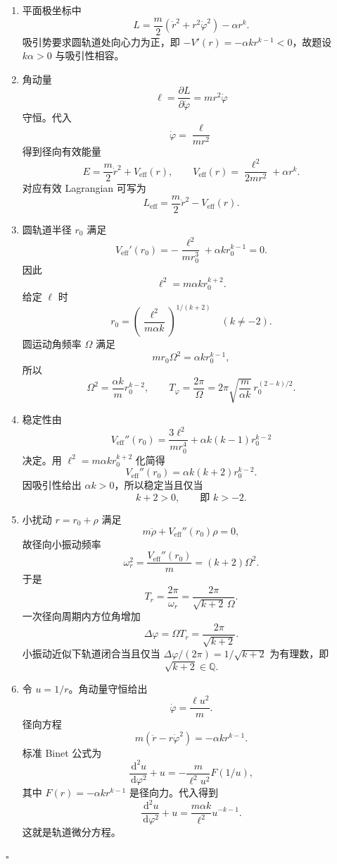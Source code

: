 \documentclass[UTF8,12pt]{ctexart}
\newcommand{\dd}{\,\mathrm d}
\newenvironment{solution}{%
  \par\medskip
  \noindent{\bfseries 解答}\quad\ignorespaces
}{\hfill$\square$\par\medskip}
\begin{document}
\begin{solution}
\begin{enumerate}[label=(\alph*)]
\item 平面极坐标中
\[
L=\frac m2(\dot r^2+r^2\dot\varphi^2)-\alpha r^k.
\]
吸引势要求圆轨道处向心力为正，即 \(-V'(r)=-\alpha k r^{k-1}<0\)，故题设 \(k\alpha>0\) 与吸引性相容。

\item 角动量
\[
\ell=\frac{\partial L}{\partial\dot\varphi}=mr^2\dot\varphi
\]
守恒。代入
\[
\dot\varphi=\frac{\ell}{mr^2}
\]
得到径向有效能量
\[
E=\frac m2\dot r^2+V_{\mathrm{eff}}(r),
\qquad
V_{\mathrm{eff}}(r)=\frac{\ell^2}{2mr^2}+\alpha r^k.
\]
对应有效 Lagrangian 可写为
\[
L_{\mathrm{eff}}=\frac m2\dot r^2-V_{\mathrm{eff}}(r).
\]

\item 圆轨道半径 \(r_0\) 满足
\[
V_{\mathrm{eff}}'(r_0)
=-\frac{\ell^2}{mr_0^3}+\alpha k r_0^{k-1}=0.
\]
因此
\[
\ell^2=m\alpha k r_0^{k+2}.
\]
给定 \(\ell\) 时
\[
r_0=\left(\frac{\ell^2}{m\alpha k}\right)^{1/(k+2)}
\quad(k\ne -2).
\]
圆运动角频率 \(\Omega\) 满足
\[
m r_0\Omega^2=\alpha k r_0^{k-1},
\]
所以
\[
\Omega^2=\frac{\alpha k}{m}r_0^{k-2},
\qquad
T_\varphi=\frac{2\pi}{\Omega}
=2\pi\sqrt{\frac{m}{\alpha k}}\,r_0^{(2-k)/2}.
\]

\item 稳定性由
\[
V_{\mathrm{eff}}''(r_0)
=\frac{3\ell^2}{mr_0^4}+\alpha k(k-1)r_0^{k-2}
\]
决定。用 \(\ell^2=m\alpha k r_0^{k+2}\) 化简得
\[
V_{\mathrm{eff}}''(r_0)
=\alpha k(k+2)r_0^{k-2}.
\]
因吸引性给出 \(\alpha k>0\)，所以稳定当且仅当
\[
k+2>0,\qquad\text{即 }k>-2.
\]

\item 小扰动 \(r=r_0+\rho\) 满足
\[
m\ddot\rho+V_{\mathrm{eff}}''(r_0)\rho=0,
\]
故径向小振动频率
\[
\omega_r^2=\frac{V_{\mathrm{eff}}''(r_0)}m
=(k+2)\Omega^2.
\]
于是
\[
T_r=\frac{2\pi}{\omega_r}
=\frac{2\pi}{\sqrt{k+2}\,\Omega}.
\]
一次径向周期内方位角增加
\[
\Delta\varphi=\Omega T_r=\frac{2\pi}{\sqrt{k+2}}.
\]
小振动近似下轨道闭合当且仅当 \(\Delta\varphi/(2\pi)=1/\sqrt{k+2}\) 为有理数，即
\[
\sqrt{k+2}\in\mathbb Q.
\]

\item 令 \(u=1/r\)。角动量守恒给出
\[
\dot\varphi=\frac{\ell u^2}{m}.
\]
径向方程
\[
m(\ddot r-r\dot\varphi^2)=-\alpha k r^{k-1}.
\]
标准 Binet 公式为
\[
\frac{\dd^2u}{\dd\varphi^2}+u
=-\frac{m}{\ell^2u^2}F(1/u),
\]
其中 \(F(r)=-\alpha k r^{k-1}\) 是径向力。代入得到
\[
\frac{\dd^2u}{\dd\varphi^2}+u
=\frac{m\alpha k}{\ell^2}u^{-k-1}.
\]
这就是轨道微分方程。
\end{enumerate}
\end{solution}
\end{document}
